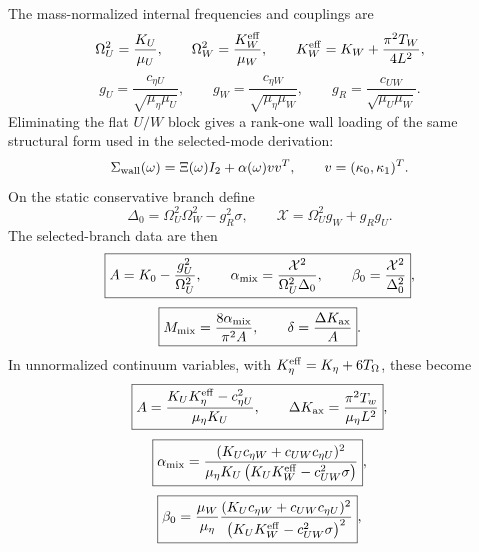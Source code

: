 The mass-normalized internal frequencies and couplings are
\begin{equation}
\label{eq:app-stage037-frequencies}
\Omega_U^2=\frac{K_U}{\mu_U},
\qquad
\Omega_W^2=\frac{K_W^{\rm eff}}{\mu_W},
\qquad
K_W^{\rm eff}=K_W+\frac{\pi^2T_W}{4L^2},
\end{equation}
\begin{equation}
\label{eq:app-stage037-couplings}
g_U=\frac{c_{\eta U}}{\sqrt{\mu_\eta\mu_U}},
\qquad
g_W=\frac{c_{\eta W}}{\sqrt{\mu_\eta\mu_W}},
\qquad
g_R=\frac{c_{UW}}{\sqrt{\mu_U\mu_W}}.
\end{equation}
Eliminating the flat \(U/W\) block gives a rank-one wall loading of the same structural form used in the selected-mode derivation:
\begin{equation}
\label{eq:app-stage037-schur-form}
\Sigma_{\rm wall}(\omega)=\Xi(\omega)I_2+\alpha(\omega)vv^T,
\qquad
v=(\kappa_0,\kappa_1)^T.
\end{equation}
On the static conservative branch define
\begin{equation}
\label{eq:app-stage037-Delta-X}
\Delta_0=\Omega_U^2\Omega_W^2-g_R^2\sigma,
\qquad
\mathcal X=\Omega_U^2g_W+g_Rg_U.
\end{equation}
The selected-branch data are then
\begin{equation}
\label{eq:app-stage037-normalized-data}
\boxed{
A=K_0-\frac{g_U^2}{\Omega_U^2},
\qquad
\alpha_{\rm mix}=\frac{\mathcal X^2}{\Omega_U^2\Delta_0},
\qquad
\beta_0=\frac{\mathcal X^2}{\Delta_0^2}},
\end{equation}
\begin{equation}
\label{eq:app-stage037-Mdelta}
\boxed{
M_{\rm mix}=\frac{8\alpha_{\rm mix}}{\pi^2A},
\qquad
\delta=\frac{\Delta K_{\rm ax}}{A}}.
\end{equation}
In unnormalized continuum variables, with \(K_\eta^{\rm eff}=K_\eta+6T_\Omega\), these become
\begin{equation}
\label{eq:app-stage037-A-DK-continuum}
\boxed{
A=\frac{K_UK_\eta^{\rm eff}-c_{\eta U}^2}{\mu_\eta K_U},
\qquad
\Delta K_{\rm ax}=\frac{\pi^2T_w}{\mu_\eta L^2}},
\end{equation}
\begin{equation}
\label{eq:app-stage037-alpha-beta-continuum}
\boxed{
\alpha_{\rm mix}
=\frac{(K_Uc_{\eta W}+c_{UW}c_{\eta U})^2}
{\mu_\eta K_U\left(K_UK_W^{\rm eff}-c_{UW}^2\sigma\right)}},
\end{equation}
\begin{equation}
\label{eq:app-stage037-beta-continuum}
\boxed{
\beta_0
=\frac{\mu_W}{\mu_\eta}
\frac{(K_Uc_{\eta W}+c_{UW}c_{\eta U})^2}
{\left(K_UK_W^{\rm eff}-c_{UW}^2\sigma\right)^2}},
\end{equation}
